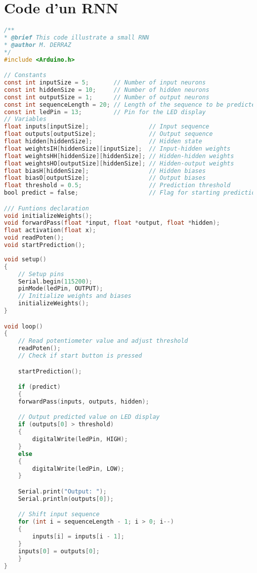 \section{Code d'un RNN}\label{RNN-code}
\begin{lstlisting}[language=C, caption={Constants for a simple RNN}]
/**
* @brief This code illustrate a small RNN
* @author M. DERRAZ
*/
#include <Arduino.h>

// Constants
const int inputSize = 5;       // Number of input neurons
const int hiddenSize = 10;     // Number of hidden neurons
const int outputSize = 1;      // Number of output neurons
const int sequenceLength = 20; // Length of the sequence to be predicted
const int ledPin = 13;         // Pin for the LED display
// Variables
float inputs[inputSize];                 // Input sequence
float outputs[outputSize];               // Output sequence
float hidden[hiddenSize];                // Hidden state
float weightsIH[hiddenSize][inputSize];  // Input-hidden weights
float weightsHH[hiddenSize][hiddenSize]; // Hidden-hidden weights
float weightsHO[outputSize][hiddenSize]; // Hidden-output weights
float biasH[hiddenSize];                 // Hidden biases
float biasO[outputSize];                 // Output biases
float threshold = 0.5;                   // Prediction threshold
bool predict = false;                    // Flag for starting prediction sequence

/// Funtions declaration
void initializeWeights();
void forwardPass(float *input, float *output, float *hidden);
float activation(float x);
void readPoten();
void startPrediction();
\end{lstlisting}

\newpage

\begin{lstlisting}[language=C, caption={Loop and Setup functions for a simple RNN}]
void setup()
{
    // Setup pins
    Serial.begin(115200);
    pinMode(ledPin, OUTPUT);
    // Initialize weights and biases
    initializeWeights();
}

void loop()
{
    // Read potentiometer value and adjust threshold
    readPoten();
    // Check if start button is pressed

    startPrediction();

    if (predict)
    {
    forwardPass(inputs, outputs, hidden);

    // Output predicted value on LED display
    if (outputs[0] > threshold)
    {
        digitalWrite(ledPin, HIGH);
    }
    else
    {
        digitalWrite(ledPin, LOW);
    }

    Serial.print("Output: ");
    Serial.println(outputs[0]);

    // Shift input sequence
    for (int i = sequenceLength - 1; i > 0; i--)
    {
        inputs[i] = inputs[i - 1];
    }
    inputs[0] = outputs[0];
    }
}
\end{lstlisting}

